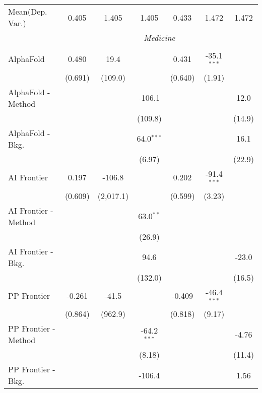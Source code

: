 \begin{tabular}{lcccccc}
Mean(Dep. Var.) & 0.405 & 1.405 & 1.405 & 0.433 & 1.472 & 1.472 \\
 & \multicolumn{6}{c}{\textit{Medicine}} \\ \\
   AlphaFold            & 0.480   & 19.4      &               & 0.431   & -35.1$^{***}$ &   \\   
                        & (0.691) & (109.0)   &               & (0.640) & (1.91)        &   \\   
   AlphaFold - Method   &         &           & -106.1        &         &               & 12.0\\   
                        &         &           & (109.8)       &         &               & (14.9)\\   
   AlphaFold - Bkg.     &         &           & 64.0$^{***}$  &         &               & 16.1\\   
                        &         &           & (6.97)        &         &               & (22.9)\\   
   AI Frontier          & 0.197   & -106.8    &               & 0.202   & -91.4$^{***}$ &   \\   
                        & (0.609) & (2,017.1) &               & (0.599) & (3.23)        &   \\   
   AI Frontier - Method &         &           & 63.0$^{**}$   &         &               &   \\   
                        &         &           & (26.9)        &         &               &   \\   
   AI Frontier - Bkg.   &         &           & 94.6          &         &               & -23.0\\   
                        &         &           & (132.0)       &         &               & (16.5)\\   
   PP Frontier          & -0.261  & -41.5     &               & -0.409  & -46.4$^{***}$ &   \\   
                        & (0.864) & (962.9)   &               & (0.818) & (9.17)        &   \\   
   PP Frontier - Method &         &           & -64.2$^{***}$ &         &               & -4.76\\   
                        &         &           & (8.18)        &         &               & (11.4)\\   
   PP Frontier - Bkg.   &         &           & -106.4        &         &               & 1.56\\   

\end{tabular}
